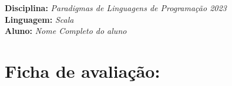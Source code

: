 



\noindent
\textbf{Disciplina:} \textit{Paradigmas de Linguagens de Programa\c{c}\~{a}o 2023}\\
\textbf{Linguagem:} \textit{Scala}\\
\textbf{Aluno:} \textit{ \color{blue} Nome Completo do aluno}


\section*{Ficha de avalia\c{c}\~{a}o:}



